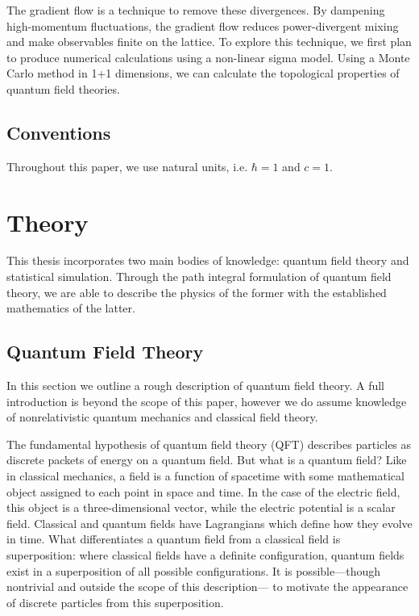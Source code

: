 \documentclass[12pt]{report}
\begin{document}
The gradient flow is a technique to remove these divergences. By dampening high-momentum fluctuations, the gradient flow reduces power-divergent mixing and make observables finite on the lattice.\cite{monahan2016} To explore this technique, we first plan to produce numerical calculations using a non-linear sigma model. Using a Monte Carlo method in 1+1 dimensions, we can calculate the topological properties of quantum field theories. 

\section{Conventions}

Throughout this paper, we use natural units, i.e. $\hbar = 1$ and $c=1$.


\chapter{Theory}

This thesis incorporates two main bodies of knowledge: quantum field theory and statistical simulation. Through the path integral formulation of quantum field theory, we are able to describe the physics of the former with the established mathematics of the latter.

\section{Quantum Field Theory}


In this section we outline a rough description of quantum field theory. A full introduction is beyond the scope of this paper, however we do assume knowledge of nonrelativistic quantum mechanics and classical field theory.

The fundamental hypothesis of quantum field theory (QFT) describes particles as discrete packets of energy on a quantum field. But what is a quantum field? Like in classical mechanics, a field is a function of spacetime with some mathematical object assigned to each point in space and time. In the case of the electric field, this object is a three-dimensional vector, while the electric potential is a scalar field. Classical and quantum fields have Lagrangians which define how they evolve in time. What differentiates a quantum field from a classical field is superposition: where classical fields have a definite configuration, quantum fields exist in a superposition of all possible configurations. It is possible---though nontrivial and outside the scope of this description--- to motivate the appearance of discrete particles from this superposition.
\end{document}
